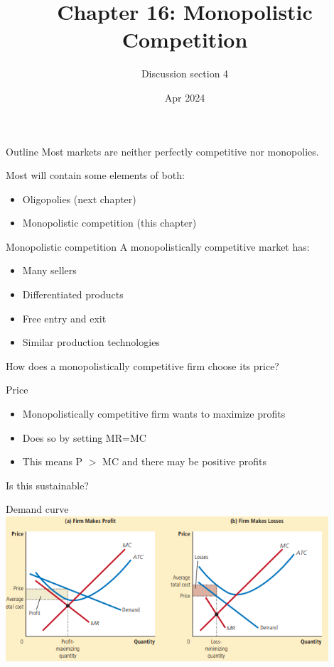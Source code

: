 \documentclass[aspectratio=169]{beamer}
\title{Chapter 16: Monopolistic Competition}
\author{Discussion section 4}
\date{Apr 2024}
\begin{document}
\begin{frame}
    \titlepage 
\end{frame}

\begin{frame}{Outline}
Most markets are neither perfectly competitive nor monopolies.

\vspace{5mm}

Most will contain some elements of both:
\begin{itemize}
    \item Oligopolies (next chapter)
    \item Monopolistic competition (this chapter)
\end{itemize}
\end{frame}

\begin{frame}{Monopolistic competition}
    A monopolistically competitive market has:
    \begin{itemize}
        \item Many sellers
        \item Differentiated products
        \item Free entry and exit
        \item Similar production technologies
    \end{itemize}

    How does a monopolistically competitive firm choose its price?
\end{frame}

\begin{frame}{Price}
    \begin{itemize}
        \item Monopolistically competitive firm wants to maximize profits
        \item Does so by setting MR=MC
        \item This means P $>$ MC and there may be positive profits
    \end{itemize}

    Is this sustainable?
\end{frame}

\begin{frame}{Demand curve}
    \centering
    \includegraphics[width = 0.9\textwidth,keepaspectratio]{MCprofit.png}
\end{frame}
\end{document}
